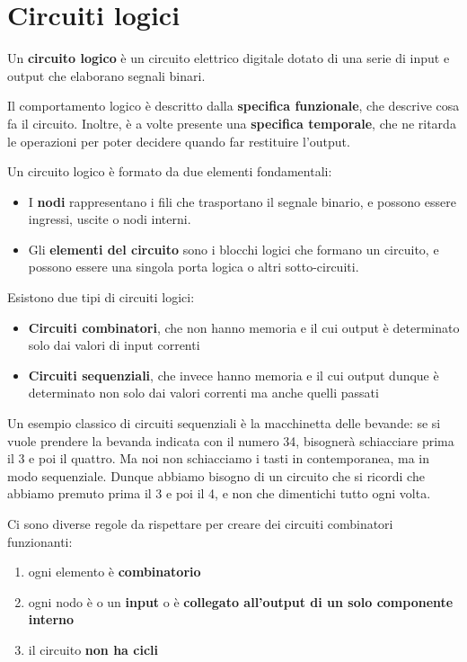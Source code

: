 \documentclass[11pt, a4paper, titlepage, oneside]{scrbook}
\begin{document}
\section{Circuiti logici}

\begin{Definizione}
\label{def-circuito-logico}
Un \textbf{circuito logico} è un circuito elettrico digitale dotato di una serie di input e output che elaborano segnali binari.
\end{Definizione}
Il comportamento logico è descritto dalla \textbf{specifica funzionale}, che descrive cosa fa il circuito. Inoltre, è a volte presente una \textbf{specifica temporale}, che ne ritarda le operazioni per poter decidere quando far restituire l'output.

Un circuito logico è formato da due elementi fondamentali:
\begin{itemize}
    \item I \textbf{nodi} rappresentano i fili che trasportano il segnale binario, e possono essere ingressi, uscite o nodi interni.
    \item Gli \textbf{elementi del circuito} sono i blocchi logici che formano un circuito, e possono essere una singola porta logica o altri sotto-circuiti.
\end{itemize}

Esistono due tipi di circuiti logici:
\begin{itemize}
    \item \textbf{Circuiti combinatori}, che non hanno memoria e il cui output è determinato solo dai valori di input correnti
    \item \textbf{Circuiti sequenziali}, che invece hanno memoria e il cui output dunque è determinato non solo dai valori correnti ma anche quelli passati
\end{itemize}

Un esempio classico di circuiti sequenziali è la macchinetta delle bevande: se si vuole prendere la bevanda indicata con il numero 34, bisognerà schiacciare prima il 3 e poi il quattro. Ma noi non schiacciamo i tasti in contemporanea, ma in modo sequenziale. Dunque abbiamo bisogno di un circuito che si ricordi che abbiamo premuto prima il 3 e poi il 4, e non che dimentichi tutto ogni volta.

\begin{Proprieta}
\label{prop-regole-circuiti-combinatori}
Ci sono diverse regole da rispettare per creare dei circuiti combinatori funzionanti:
\begin{enumerate}
    \item ogni elemento è \textbf{combinatorio}
    \item ogni nodo è o un \textbf{input} o è \textbf{collegato all'output di un solo componente interno}
    \item il circuito \textbf{non ha cicli}
\end{enumerate}
\end{Proprieta}
\end{document}

